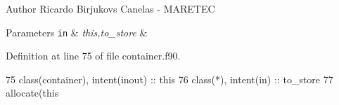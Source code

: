 \begin{DoxyAuthor}{Author}
Ricardo Birjukovs Canelas -\/ M\+A\+R\+E\+T\+EC 
\end{DoxyAuthor}

\begin{DoxyParams}[1]{Parameters}
\mbox{\tt in}  & {\em this,to\+\_\+store} & \\
\hline
\end{DoxyParams}


Definition at line 75 of file container.\+f90.


\begin{DoxyCode}
75     \textcolor{keywordtype}{class}(container), \textcolor{keywordtype}{intent(inout)} :: this
76     \textcolor{keywordtype}{class}(*), \textcolor{keywordtype}{intent(in)} :: to\_store
77     \textcolor{keyword}{allocate}(this%
\end{DoxyCode}
